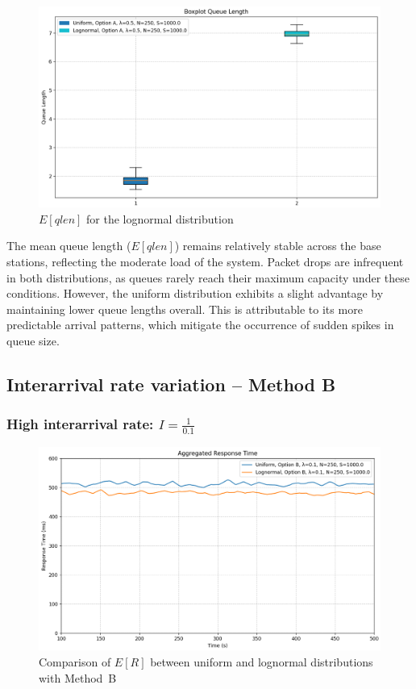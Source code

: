 \documentclass{report}
\begin{document}
\begin{figure}[H] 
    \centering 
    \includegraphics[width=\textwidth]{img/plots/I-vary/Q_Box_A_I05.png} \caption{$E[qlen]$ for the lognormal distribution} 
\end{figure}

\begin{flushleft}
The mean queue length ($E[qlen]$) remains relatively stable across the base stations, reflecting the moderate load of the system. Packet drops are infrequent in both distributions, as queues rarely reach their maximum capacity under these conditions. However, the uniform distribution exhibits a slight advantage by maintaining lower queue lengths overall. This is attributable to its more predictable arrival patterns, which mitigate the occurrence of sudden spikes in queue size.
\end{flushleft}


\subsection{Interarrival rate variation -- Method B}
\subsubsection*{High interarrival rate: $I = \frac{1}{0.1}$}
\begin{figure}[H]
    \centering
    \includegraphics[width=\textwidth]{img/plots/I-vary/R_B_I01.png}
    \caption{Comparison of $E[R]$ between uniform and lognormal distributions with Method~B}
\end{figure}
\end{document}
